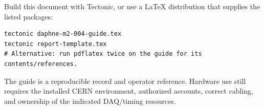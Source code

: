 \documentclass[10pt,a4paper]{article}
\begin{document}
Build this document with Tectonic, or use a LaTeX distribution that supplies the listed packages:
\begin{lstlisting}
tectonic daphne-m2-004-guide.tex
tectonic report-template.tex
# Alternative: run pdflatex twice on the guide for its contents/references.
\end{lstlisting}
The guide is a reproducible record and operator reference. Hardware use still requires the installed CERN environment, authorized accounts, correct cabling, and ownership of the indicated DAQ/timing resources.
\end{document}
